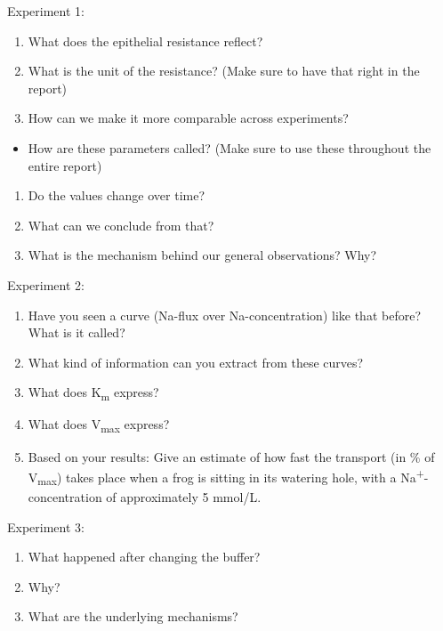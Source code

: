 \documentclass[
]{book}
\providecommand{\tightlist}{%
  \setlength{\itemsep}{0pt}\setlength{\parskip}{0pt}}
\begin{document}
Experiment 1:

\begin{enumerate}
\def\labelenumi{\arabic{enumi}.}
\item
  What does the epithelial resistance reflect?
\item
  What is the unit of the resistance? (Make sure to have that right in the report)
\item
  How can we make it more comparable across experiments?
\end{enumerate}

\begin{itemize}
\tightlist
\item
  How are these parameters called? (Make sure to use these throughout the entire report)
\end{itemize}

\begin{enumerate}
\def\labelenumi{\arabic{enumi}.}
\setcounter{enumi}{3}
\item
  Do the values change over time?
\item
  What can we conclude from that?
\item
  What is the mechanism behind our general observations? Why?
\end{enumerate}

Experiment 2:

\begin{enumerate}
\def\labelenumi{\arabic{enumi}.}
\item
  Have you seen a curve (Na-flux over Na-concentration) like that before? What is it called?
\item
  What kind of information can you extract from these curves?
\item
  What does K\textsubscript{m} express?
\item
  What does V\textsubscript{max} express?
\item
  Based on your results: Give an estimate of how fast the transport (in \% of V\textsubscript{max}) takes place when a frog is sitting in its watering hole, with a Na\textsuperscript{+}-concentration of approximately 5 mmol/L.
\end{enumerate}

Experiment 3:

\begin{enumerate}
\def\labelenumi{\arabic{enumi}.}
\item
  What happened after changing the buffer?
\item
  Why?
\item
  What are the underlying mechanisms?
\end{enumerate}
\end{document}
